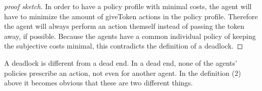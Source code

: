 \begin{proof}[proof sketch]
  In order to have a policy profile with minimal costs, the agent will have to minimize the amount of giveToken actions in the policy profile. Therefore the agent will always perform an action themself instead of passing the token away, if possible. Because the agents have a common individual policy of keeping the subjective costs minimal, this contradicts the definition of a deadlock.
\end{proof}


A deadlock is different from a dead end. In a dead end, none of the agents' policies prescribe an action, not even for another agent. In the definition (2) above it becomes obvious that these are two different things. 
